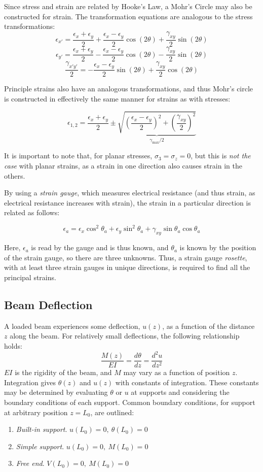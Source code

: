 Since stress and strain are related by Hooke's Law, a Mohr's Circle may also be constructed for strain. The transformation equations are analogous to the stress transformations: \[\epsilon_{x'} = \frac{\epsilon_x + \epsilon_y}{2} + \frac{\epsilon_x-\epsilon_y}{2}\cos(2\theta) + \frac{\gamma_{xy}}{2}\sin(2\theta)\]
    \[\epsilon_{y'} = \frac{\epsilon_x + \epsilon_y}{2} - \frac{\epsilon_x-\epsilon_y}{2}\cos(2\theta) - \frac{\gamma_{xy}}{2}\sin(2\theta)\]
    \[\frac{\gamma_{x'y'}}{2} = - \frac{\epsilon_x-\epsilon_y}{2}\sin(2\theta) + \frac{\gamma_{xy}}{2}\cos(2\theta)\]

Principle strains also have an analogous transformations, and thus Mohr's circle is constructed in effectively the same manner for strains as with stresses:

\[\epsilon_{1,2} = \frac{\epsilon_x+\epsilon_y}{2}\pm \underbrace{\sqrt{\left(\frac{\epsilon_x-\epsilon_y}{2}\right)^2 + \left(\frac{\gamma_{xy}}{2}\right)^2}}_{\gamma_{\text{max}}/2}\]

It is important to note that, for planar stresses, $\sigma_3 = \sigma_z = 0$, but this is \textit{not the case} with planar strains, as a strain in one direction also causes strain in the others.

By using a \textit{strain gauge}, which measures electrical resistance (and thus strain, as electrical resistance increases with strain), the strain in a particular direction is related as follows:

\[\epsilon_a = \epsilon_x\cos^2\theta_a + \epsilon_y \sin^2\theta_a + \gamma_{xy}\sin\theta_a\cos\theta_a\]

Here, $\epsilon_a$ is read by the gauge and is thus known, and $\theta_a$ is known by the position of the strain gauge, so there are three unknowns. Thus, a strain gauge \textit{rosette}, with at least three strain gauges in unique directions, is required to find all the principal strains.

\subsection{Beam Deflection}

A loaded beam experiences some deflection, $u(z)$, as a function of the distance $z$ along the beam. For relatively small deflections, the following relationship holds: \[\frac{M(z)}{EI} = \frac{d\theta}{dz} = \frac{d^2u}{dz^2}\] $EI$ is the rigidity of the beam, and $M$ may vary as a function of position $z$. Integration gives $\theta(z)$ and $u(z)$ with constants of integration. These constants may be determined by evaluating $\theta$ or $u$ at supports and considering the boundary conditions of each support. Common boundary conditions, for support at arbitrary position $z=L_0$, are outlined:
\begin{enumerate}
    \item[] \textit{Built-in support}. \(u(L_0) = 0,\ \theta(L_0)=0\)
    \item[] \textit{Simple support}. \(u(L_0) = 0,\ M(L_0) = 0\)
    \item[] \textit{Free end}. \(V(L_0) = 0,\ M(L_0) = 0\)
\end{enumerate}
